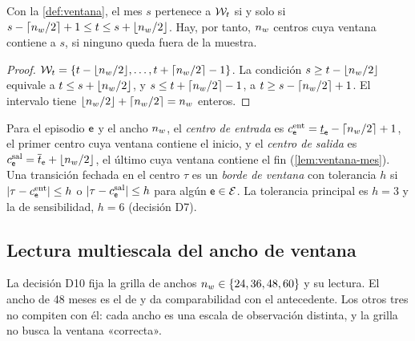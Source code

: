 \begin{lema}\label{lem:ventana-mes}
Con la \cref{def:ventana}, el mes $s$ pertenece a $\mathcal{W}_t$ si y solo si
$s-\lceil n_{w}/2\rceil+1\le t\le s+\lfloor n_{w}/2\rfloor$. Hay, por tanto, $n_{w}$ centros cuya ventana
contiene a $s$, si ninguno queda fuera de la muestra.
\end{lema}

\begin{proof}
$\mathcal{W}_t=\{t-\lfloor n_{w}/2\rfloor,\dots,t+\lceil n_{w}/2\rceil-1\}$. La condición
$s\ge t-\lfloor n_{w}/2\rfloor$ equivale a $t\le s+\lfloor n_{w}/2\rfloor$, y
$s\le t+\lceil n_{w}/2\rceil-1$, a $t\ge s-\lceil n_{w}/2\rceil+1$. El intervalo tiene
$\lfloor n_{w}/2\rfloor+\lceil n_{w}/2\rceil=n_{w}$ enteros.
\end{proof}

\begin{definicion}\label{def:borde}
Para el episodio $\mathsf{e}$ y el ancho $n_{w}$, el \emph{centro de entrada} es
$c^{\mathrm{ent}}_{\mathsf{e}}=\underline{t}_{\mathsf{e}}-\lceil n_{w}/2\rceil+1$, el primer centro cuya ventana contiene el
inicio, y el \emph{centro de salida} es $c^{\mathrm{sal}}_{\mathsf{e}}=\overline{t}_{\mathsf{e}}+\lfloor n_{w}/2\rfloor$, el
último cuya ventana contiene el fin (\cref{lem:ventana-mes}). Una transición fechada en el centro
$\tau$ es un \emph{borde de ventana} con tolerancia $h$ si
$\lvert \tau-c^{\mathrm{ent}}_{\mathsf{e}}\rvert\le h$ o $\lvert \tau-c^{\mathrm{sal}}_{\mathsf{e}}\rvert\le h$ para algún
$\mathsf{e}\in\mathcal{E}$. La tolerancia principal es $h=3$ y la de sensibilidad, $h=6$ (decisión D7).
\end{definicion}

\subsection{Lectura multiescala del ancho de ventana}
\label{sec:multiescala}

La decisión D10 fija la grilla de anchos $n_{w}\in\{24, 36, 48, 60\}$ y su lectura. El ancho de 48 meses
es el de \textcite{camiz_cerda_atoche_2026} y da comparabilidad con el antecedente. Los otros tres
no compiten con él: cada ancho es una escala de observación distinta, y la grilla no busca la
ventana «correcta».


